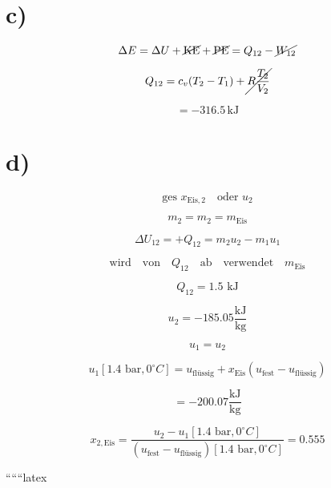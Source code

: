 \section*{c)}

\[
\Delta E = \Delta U + \cancel{\text{KE}} + \cancel{\text{PE}} = Q_{12} - \cancel{W_{12}}
\]

\[
Q_{12} = c_v (T_2 - T_1) + \cancel{R \frac{T_2}{V_2}}
\]

\[
= -316.5 \, \text{kJ}
\]

\section*{d)}

\[
\text{ges } x_{\text{Eis},2} \quad \text{oder } u_2
\]

\[
m_2 = m_2 = m_{\text{Eis}}
\]

\[
\Delta U_{12} = + Q_{12} = m_2 u_2 - m_1 u_1
\]

\[
\text{wird} \quad \text{von} \quad Q_{12} \quad \text{ab} \quad \text{verwendet} \quad m_{\text{Eis}}
\]

\[
Q_{12} = 1.5 \text{ kJ}
\]

\[
u_2 = -185.05 \frac{\text{kJ}}{\text{kg}}
\]

\[
u_1 = u_2
\]

\[
u_1 [1.4 \text{ bar}, 0^\circ C] = u_{\text{flüssig}} + x_{\text{Eis}} (u_{\text{fest}} - u_{\text{flüssig}})
\]

\[
= -200.07 \frac{\text{kJ}}{\text{kg}}
\]

\[
x_{2, \text{Eis}} = \frac{u_2 - u_{1} [1.4 \text{ bar}, 0^\circ C]}{(u_{\text{fest}} - u_{\text{flüssig}}) [1.4 \text{ bar}, 0^\circ C]} = 0.555
\]

``````latex


